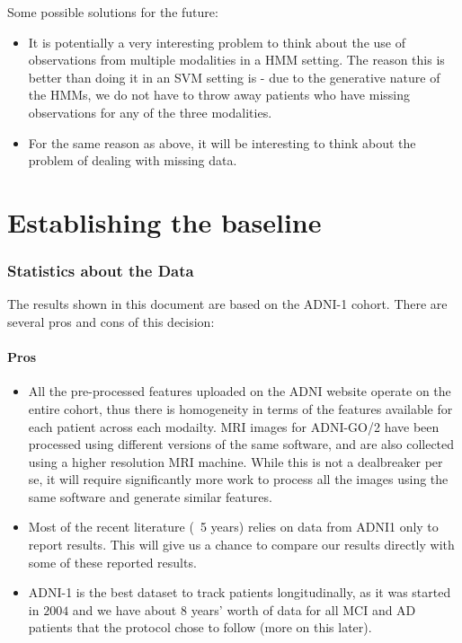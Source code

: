 \documentclass[12pt,a4paper]{article}
\begin{document}
Some possible solutions for the future:

\begin{itemize}
\item It is potentially a very interesting problem to think about the
  use of observations from multiple modalities in a HMM setting. The
  reason this is better than doing it in an SVM setting is - due to
  the generative nature of the HMMs, we do not have to throw away
  patients who have missing observations for any of the three modalities.
\item For the same reason as above, it will be interesting to think
  about the problem of dealing with missing data.
\end{itemize}

\part{Establishing the baseline}

\section{Statistics about the Data}
\label{sec:stats}

The results shown in this document are based on the ADNI-1
cohort. There are several pros and cons of this decision:

\subsection{Pros}

\begin{itemize}
\item All the pre-processed features uploaded on the ADNI website
  operate on the entire cohort, thus there is homogeneity in terms of
  the features available for each patient across each modailty. MRI
  images for ADNI-GO/2 have been processed using different versions of
  the same software, and are also collected using a higher resolution
  MRI machine. While this is not a dealbreaker per se, it will require
  significantly more work to process all the images using the same
  software and generate similar features.
\item Most of the recent literature (~5 years) relies on data from ADNI1
  only to report results. This will give us a chance to compare our
  results directly with some of these reported results.
\item ADNI-1 is the best dataset to track patients longitudinally, as
  it was started in $2004$ and we have about $8$ years' worth of data
  for all MCI and AD patients that the protocol chose to follow (more
  on this later). 
\end{itemize}
\end{document}
